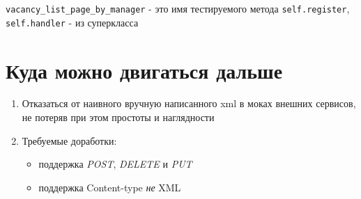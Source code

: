 \documentclass[12pt]{article}
\begin{document}
\verb+vacancy_list_page_by_manager+ - это имя тестируемого метода
\verb+self.register+, \verb+self.handler+ - из суперкласса

\section{Куда можно двигаться дальше}

\begin{enumerate}
\item Отказаться от наивного вручную написанного xml в моках внешних сервисов, не потеряв при этом простоты и наглядности
\item Требуемые доработки:
\begin{itemize}
\item поддержка \emph{POST}, \emph{DELETE} и \emph{PUT}
\item поддержка Content-type \emph{не} XML

\end{itemize}

\end{enumerate}
\end{document}

